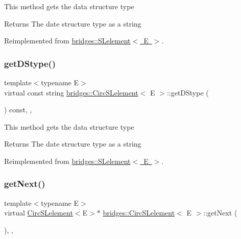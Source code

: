 This method gets the data structure type

\begin{DoxyReturn}{Returns}
The date structure type as a string 
\end{DoxyReturn}


Reimplemented from \mbox{\hyperlink{classbridges_1_1_s_lelement_a136330b3481a47b3edb429f323274655}{bridges\+::\+S\+Lelement$<$ E $>$}}.

\mbox{\label{classbridges_1_1_circ_s_lelement_a4b27c205af46162371e3ffe05cbbe3d5}} 
\subsubsection{\texorpdfstring{get\+D\+Stype()}{getDStype()}\hspace{0.1cm}{\footnotesize\ttfamily [2/2]}}
{\footnotesize\ttfamily template$<$typename E$>$ \\
virtual const string \mbox{\hyperlink{classbridges_1_1_circ_s_lelement}{bridges\+::\+Circ\+S\+Lelement}}$<$ E $>$\+::get\+D\+Stype (\begin{DoxyParamCaption}{ }\end{DoxyParamCaption}) const\hspace{0.3cm}{\ttfamily [inline]}, {\ttfamily [override]}, {\ttfamily [virtual]}}

This method gets the data structure type

\begin{DoxyReturn}{Returns}
The date structure type as a string 
\end{DoxyReturn}


Reimplemented from \mbox{\hyperlink{classbridges_1_1_s_lelement_a136330b3481a47b3edb429f323274655}{bridges\+::\+S\+Lelement$<$ E $>$}}.

\mbox{\label{classbridges_1_1_circ_s_lelement_aab863627c125c6f1075af7e7b7f340cf}} 
\subsubsection{\texorpdfstring{get\+Next()}{getNext()}\hspace{0.1cm}{\footnotesize\ttfamily [1/2]}}
{\footnotesize\ttfamily template$<$typename E$>$ \\
virtual \mbox{\hyperlink{classbridges_1_1_circ_s_lelement}{Circ\+S\+Lelement}}$<$E$>$$\ast$ \mbox{\hyperlink{classbridges_1_1_circ_s_lelement}{bridges\+::\+Circ\+S\+Lelement}}$<$ E $>$\+::get\+Next (\begin{DoxyParamCaption}{ }\end{DoxyParamCaption})\hspace{0.3cm}{\ttfamily [inline]}, {\ttfamily [override]}, {\ttfamily [virtual]}}

